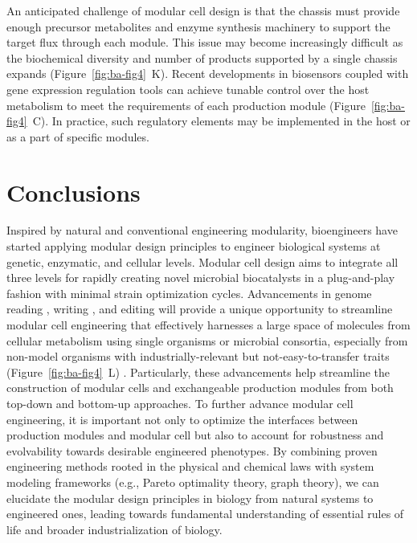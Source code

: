 An anticipated challenge of modular cell design is that the chassis must provide enough precursor metabolites and enzyme synthesis machinery to support the target flux through each module.
This issue may become increasingly difficult as the biochemical diversity and number of products supported by a single chassis expands (Figure~\ref{fig:ba-fig4}~K).
Recent developments in biosensors coupled with gene expression regulation tools \citep{liu2015, meyer2018, moser2018, yang2018, zhang2012} can achieve tunable control over the host metabolism to meet the requirements of each production module (Figure~\ref{fig:ba-fig4}~C).
In practice, such regulatory elements may be implemented in the host or as a part of specific modules.

\section{Conclusions}

Inspired by natural and conventional engineering modularity, bioengineers have started applying modular design principles to engineer biological systems at genetic, enzymatic, and cellular levels.
Modular cell design aims to integrate all three levels for rapidly creating novel microbial biocatalysts in a plug-and-play fashion with minimal strain optimization cycles.
Advancements in genome reading \citep{goodwin2016}, writing \citep{casini2015, kosuri2014}, and editing \citep{barrangou2016} will provide a unique opportunity to streamline modular cell engineering that effectively harnesses a large space of molecules from cellular metabolism using single organisms or microbial consortia, especially from non-model organisms with industrially-relevant but not-easy-to-transfer traits (Figure~\ref{fig:ba-fig4}~L) \citep{abdel-mawgoud2018, carroll2018, kalyuzhnaya2015, lynd2016, thompson2016}.
Particularly, these advancements help streamline the construction of modular cells and exchangeable production modules from both top-down and bottom-up approaches.
To further advance modular cell engineering, it is important not only to optimize the interfaces between production modules and modular cell but also to account for robustness and evolvability towards desirable engineered phenotypes.
By combining proven engineering methods rooted in the physical and chemical laws with system modeling frameworks (e.g., Pareto optimality theory, graph theory), we can elucidate the modular design principles in biology from natural systems to engineered ones, leading towards fundamental understanding of essential rules of life and broader industrialization of biology.

%






